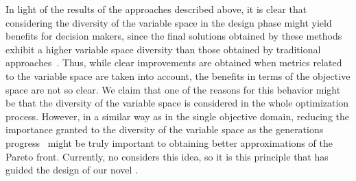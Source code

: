 In light of the results of the approaches described above, it is clear that considering the diversity of the variable space
in the design phase might yield benefits for decision makers, since the final solutions obtained by these 
methods exhibit a higher variable space diversity than those obtained by traditional 
approaches~\cite{deb2005omni, rudolph2007capabilities}.
%
Thus, while clear improvements are obtained when metrics related to the variable space are taken into account, the benefits in terms of the 
objective space are not so clear.
%
We claim that one of the reasons for this behavior might be that the diversity of the variable space is considered 
in the whole optimization process.
%
However, in a similar way as in the single objective domain, reducing the importance granted to the diversity 
of the variable space as the generations progress~\cite{Joel:MULTI_DYNAMIC} might be truly important to obtaining
better approximations of the Pareto front.
%
Currently, no \MOEA{} considers this idea, so it is this principle that has guided the design of our novel \MOEA{}.

